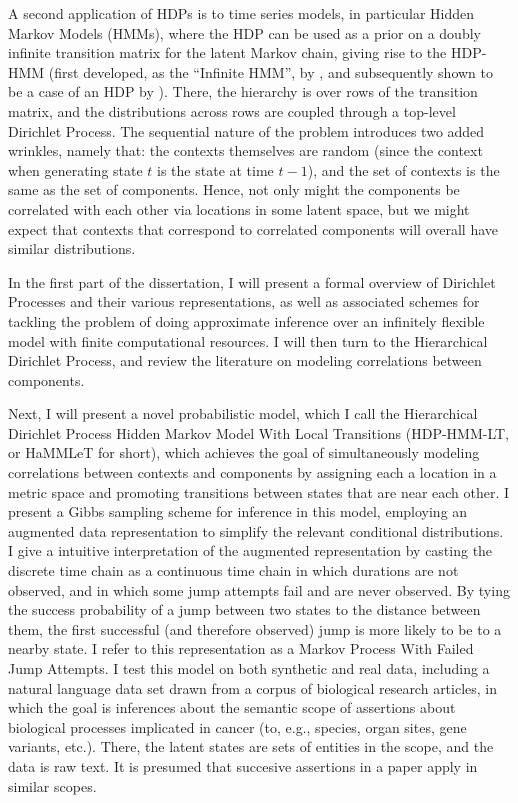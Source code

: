A second application of HDPs is to time series
models, in particular Hidden Markov Models (HMMs), where the HDP can be used
as a prior on a doubly infinite transition matrix for the latent Markov
chain, giving rise to the HDP-HMM (first developed, as the ``Infinite
HMM'', by \cite{beal2001infinite}, 
and subsequently shown to be a case of an HDP by \citet{teh2006hierarchical}).  
There, the hierarchy is over rows of the transition matrix,
and the distributions across rows are coupled through a top-level
Dirichlet Process.  The sequential nature of the problem introduces two
added wrinkles, namely that: the contexts themselves are random (since
the context when generating state $t$ is the state at time $t-1$),
and the set of contexts is the same as the set of components.  Hence,
not only might the components be correlated with each other via
locations in some latent space, but we might expect that contexts that
correspond to correlated components will overall have similar
distributions.  

In the first part of the dissertation, I will present a formal overview of
Dirichlet Processes and their various representations, as well as
associated schemes for tackling the problem of doing approximate inference over an
infinitely flexible model with finite computational resources.  I will
then turn to the Hierarchical Dirichlet Process, and review the literature on
modeling correlations between components.

Next, I will present a novel probabilistic model, which I call the
Hierarchical Dirichlet Process Hidden Markov Model With Local
Transitions (HDP-HMM-LT, or HaMMLeT for short), 
which achieves the goal of simultaneously modeling
correlations between contexts and components by assigning each
a location in a metric space and promoting transitions between states
that are near each other.  I present a Gibbs sampling scheme
for inference in this model, employing an augmented data
representation to simplify the relevant conditional distributions.  I
give a intuitive interpretation of the augmented representation by
casting the discrete time chain as a continuous time chain in which
durations are not observed, and in which some jump attempts fail and
are never observed.  By tying the success probability of a jump
between two states to the distance between them, the first successful
(and therefore observed) jump is more likely to be to a nearby state.
I refer to this representation as a Markov Process With Failed Jump
Attempts.  I test this model on both synthetic and real data,
including a natural language data set drawn from a corpus of
biological research articles, in which the goal is inferences about
the semantic scope of assertions about biological processes implicated
in cancer (to, e.g., species, organ sites, gene variants, etc.).
There, the latent states are sets of entities in the scope, and the
data is raw text.  It is presumed that succesive assertions in a paper
apply in similar scopes. 



